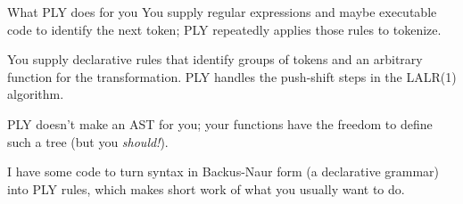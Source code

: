 \documentclass[aspectratio=169]{beamer}
\begin{document}
\begin{frame}{What PLY does for you}
\vspace{0.5 cm}
You supply regular expressions and maybe executable code to identify the next token; PLY repeatedly applies those rules to tokenize.

\vspace{0.5 cm}
You supply declarative rules that identify groups of tokens and an arbitrary function for the transformation. PLY handles the push-shift steps in the LALR(1) algorithm.

\vspace{0.5 cm}
PLY doesn't make an AST for you; your functions have the freedom to define such a tree (but you {\it should!}).

\vspace{0.5 cm}
I have some code to turn syntax in Backus-Naur form (a declarative grammar) into PLY rules, which makes short work of what you usually want to do.
\end{frame}
\end{document}
